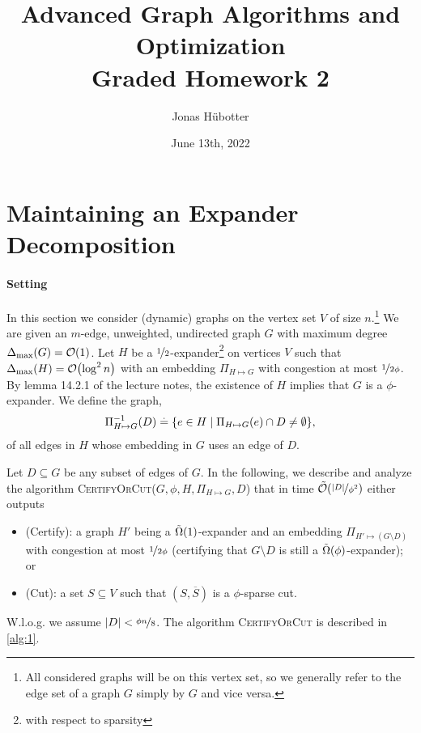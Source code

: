 \documentclass{tufte-handout}
\title[Graded Homework 2]{Advanced Graph Algorithms and Optimization \\ Graded Homework 2}
\author{Jonas Hübotter}
\date{June 13th, 2022}
\newcommand{\embed}{\Pi_{H \mapsto G}}
\newcommand{\invembed}{\inv{\Pi}_{H \mapsto G}(D)}
\newcommand{\GmD}{G \setminus D}
\newcommand{\newembed}{\Pi_{H' \mapsto (\GmD)}}
\newcommand{\cut}{(S, \overline{S})}
\begin{document}
\maketitle

\section{Maintaining an Expander Decomposition}
\paragraph{Setting} In this section we consider (dynamic) graphs on the vertex set $V$ of size $n$.\footnote{All considered graphs will be on this vertex set, so we generally refer to the edge set of a graph $G$ simply by $G$ and vice versa.} We are given an $m$-edge, unweighted, undirected graph $G$ with maximum degree $\Delta_{\max}(G) = \LandauO{1}$. Let $H$ be a $\nicefrac{1}{2}$-expander\footnote{with respect to sparsity} on vertices $V$ such that $\Delta_{\max}(H) = \LandauO{\log^2 n}$ with an embedding $\embed$ with congestion at most $\nicefrac{1}{2\phi}$. By lemma 14.2.1 of the lecture notes, the existence of $H$ implies that $G$ is a $\phi$-expander. We define the graph, \begin{align}
    \invembed \defeq \{e \in H \mid \Pi_{H \mapsto G}(e) \cap D \neq \emptyset\},
\end{align} of all edges in $H$ whose embedding in $G$ uses an edge of $D$.

Let $D \subseteq G$ be any subset of edges of $G$. In the following, we describe and analyze the algorithm \textsc{CertifyOrCut($G, \phi, H, \Pi_{H \mapsto G}, D$)} that in time $\TildeLandauO{\nicefrac{|D|}{\phi^2}}$ either outputs \begin{itemize}
    \item (Certify): a graph $H'$ being a $\TildeLandauOmega{1}$-expander and an embedding $\newembed$ with congestion at most $\nicefrac{1}{2\phi}$ (certifying that $\GmD$ is still a $\TildeLandauOmega{\phi}$-expander); or
    \item (Cut): a set $S \subseteq V$ such that $\cut$ is a $\phi$-sparse cut.
\end{itemize} W.l.o.g. we assume $|D| < \nicefrac{\phi n}{8}$. The algorithm \textsc{CertifyOrCut} is described in \cref{alg:1}.
\end{document}

